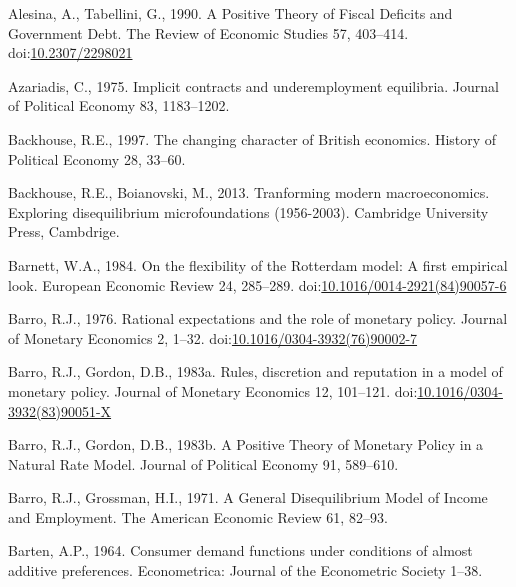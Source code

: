 \documentclass[
  12pt,
  onecolumn]{article}
\newlength{\cslhangindent}
\newlength{\cslentryspacingunit} %
\newenvironment{CSLReferences}[2] %
 {%
  \setlength{\parindent}{0pt}
  \ifodd #1
  \let\oldpar\par
  \def\par{\hangindent=\cslhangindent\oldpar}
  \fi
  \setlength{\parskip}{#2\cslentryspacingunit}
 }%
 {}
\begin{document}
\hypertarget{refs}{}
\begin{CSLReferences}{1}{0}
\leavevmode{}%
Alesina, A., Tabellini, G., 1990. A {Positive Theory} of {Fiscal
Deficits} and {Government Debt}. The Review of Economic Studies 57,
403--414. doi:\href{https://doi.org/10.2307/2298021}{10.2307/2298021}

\leavevmode{}%
Azariadis, C., 1975. Implicit contracts and underemployment equilibria.
Journal of Political Economy 83, 1183--1202.

\leavevmode{}%
Backhouse, R.E., 1997. The changing character of {British} economics.
History of Political Economy 28, 33--60.

\leavevmode{}%
Backhouse, R.E., Boianovski, M., 2013. Tranforming modern
macroeconomics. {Exploring} disequilibrium microfoundations (1956-2003).
{Cambridge University Press}, {Cambdrige}.

\leavevmode{}%
Barnett, W.A., 1984. On the flexibility of the {Rotterdam} model: {A}
first empirical look. European Economic Review 24, 285--289.
doi:\href{https://doi.org/10.1016/0014-2921(84)90057-6}{10.1016/0014-2921(84)90057-6}

\leavevmode{}%
Barro, R.J., 1976. Rational expectations and the role of monetary
policy. Journal of Monetary Economics 2, 1--32.
doi:\href{https://doi.org/10.1016/0304-3932(76)90002-7}{10.1016/0304-3932(76)90002-7}

\leavevmode{}%
Barro, R.J., Gordon, D.B., 1983a. Rules, discretion and reputation in a
model of monetary policy. Journal of Monetary Economics 12, 101--121.
doi:\href{https://doi.org/10.1016/0304-3932(83)90051-X}{10.1016/0304-3932(83)90051-X}

\leavevmode{}%
Barro, R.J., Gordon, D.B., 1983b. A {Positive Theory} of {Monetary
Policy} in a {Natural Rate Model}. Journal of Political Economy 91,
589--610.

\leavevmode{}%
Barro, R.J., Grossman, H.I., 1971. A {General Disequilibrium Model} of
{Income} and {Employment}. The American Economic Review 61, 82--93.

\leavevmode{}%
Barten, A.P., 1964. Consumer demand functions under conditions of almost
additive preferences. Econometrica: Journal of the Econometric Society
1--38.


\end{CSLReferences}
\end{document}
